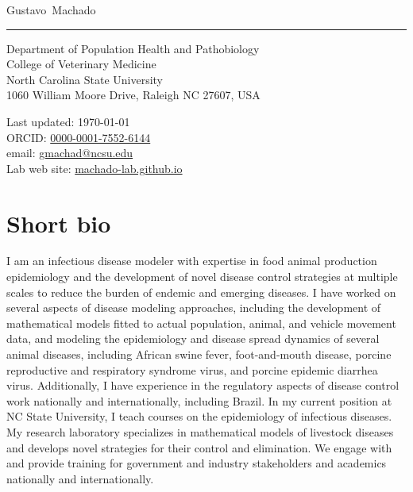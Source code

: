 \documentclass[11pt]{article}
\makeatletter
\newcommand{\NCSU}{North Carolina State University}
\newcommand{\vet}{College of Veterinary Medicine}
\newcommand{\CVM}{Department of Population Health and Pathobiology}
\newcommand{\FirstName}{Gustavo}
\newcommand{\LastName}{Machado}
\newcommand{\MyName}{\FirstName\ \LastName}
\newcommand{\Email}{gmachad@ncsu.edu}
\newcommand{\LabWebsite}{machado-lab.github.io}
\newcommand{\ORCID}{0000-0001-7552-6144}
\newcommand{\Affiliation}{\CVM \\ \vet \\ \NCSU}
\newcommand{\Address}{
  1060 William Moore Drive, Raleigh NC 27607, USA
}
\makeatother
\begin{document}
\thispagestyle{empty}

{\fontsize{22pt}{0}\selectfont\MyName}\\[-0.1cm]
\rule{\textwidth}{0.2pt}
\begin{minipage}[t]{0.595\textwidth}
  \Affiliation
  \\
  \Address
\end{minipage}
\begin{minipage}[t]{0.405\textwidth}
  \begin{flushright}
  Last updated: \monthyear\today
  \\
    ORCID: \href{https://orcid.org/\ORCID}{\ORCID}
    \\
    email: \href{mailto:\Email}{\Email}
    \\
    Lab web site: \href{https://\LabWebsite}{\LabWebsite}
  \end{flushright}
\end{minipage}

\section{Short bio}

I am an infectious disease modeler with expertise in food animal production epidemiology and the development of novel disease control strategies at multiple scales to reduce the burden of endemic and emerging diseases. I have worked on several aspects of disease modeling approaches, including the development of mathematical models fitted to actual population, animal, and vehicle movement data, and modeling the epidemiology and disease spread dynamics of several animal diseases, including African swine fever, foot-and-mouth disease, porcine reproductive and respiratory syndrome virus, and porcine epidemic diarrhea virus. Additionally, I have experience in the regulatory aspects of disease control work nationally and internationally, including Brazil. In my current position at NC State University, I teach courses on the epidemiology of infectious diseases. My research laboratory specializes in mathematical models of livestock diseases and develops novel strategies for their control and elimination. We engage with and provide training for government and industry stakeholders and academics nationally and internationally.
\end{document}
